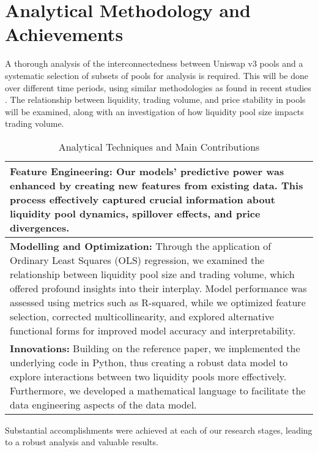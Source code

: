 \documentclass{article}
\begin{document}
\section*{\textbf{Analytical Methodology and Achievements}}

A thorough analysis of the interconnectedness between Uniswap v3 pools and a systematic selection of subsets of pools for analysis is required. This will be done over different time periods, using similar methodologies as found in recent studies \cite{defi-characterisation-2023}. The relationship between liquidity, trading volume, and price stability in pools will be examined, along with an investigation of how liquidity pool size impacts trading volume.

\begin{table}[htbp]
  \centering
  \small
  \begin{tabularx}{\linewidth}{|>{\raggedright\arraybackslash}X|}
  \hline
  \textbf{Feature Engineering:} Our models' predictive power was enhanced by creating new features from existing data\cite{defi2023uniswap}. This process effectively captured crucial information about liquidity pool dynamics, spillover effects, and price divergences. \\
  \hline
  \textbf{Modelling and Optimization:} Through the application of Ordinary Least Squares (OLS) regression, we examined the relationship between liquidity pool size and trading volume, which offered profound insights into their interplay\cite{defi2023uniswap}. Model performance was assessed using metrics such as R-squared, while we optimized feature selection, corrected multicollinearity, and explored alternative functional forms for improved model accuracy and interpretability\cite{defi2023uniswap}. \\
  \hline
  \textbf{Innovations:} Building on the reference paper, we implemented the underlying code in Python, thus creating a robust data model to explore interactions between two liquidity pools more effectively\cite{defi2023uniswap}. Furthermore, we developed a mathematical language to facilitate the data engineering aspects of the data model\cite{defi2023uniswap}. \\
  \hline
  \end{tabularx}
  \caption{Analytical Techniques and Main Contributions}
  \label{fig:analytical-techniques}
  \end{table}
  
  Substantial accomplishments were achieved at each of our research stages, leading to a robust analysis and valuable results\cite{defi2023uniswap}.
\end{document}
